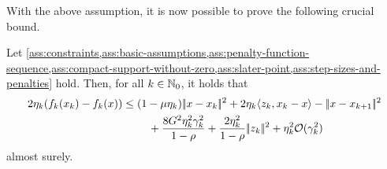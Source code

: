 With the above assumption, it is now possible to prove the following crucial bound.
\begin{lemma}
    \label{lem:functional-upper-bound}
    Let \cref{ass:constraints,ass:basic-assumptions,ass:penalty-function-sequence,ass:compact-support-without-zero,ass:slater-point,ass:step-sizes-and-penalties} hold.
    Then, for all $k\in\mathbb{N}_0$, it holds that
    \begin{align*}
        2\eta_k(f_k(x_k) - f_k(x))
        &\leq ( 1 - \mu\eta_k ) |\!|x - x_k|\!|^2 + 2\eta_k\langle z_k, x_k - x \rangle 
            - |\!|x - x_{k+1}|\!|^2 \notag \\
        &\phantom{===} + \frac{8 G^2\eta_k^2\gamma_k^2}{1 - \rho}
            + \frac{2\eta_k^2}{1 - \rho}|\!|z_k|\!|^2
            + \eta_k^2 \mathcal{O}(\gamma_k^2)
    \end{align*}
    almost surely.
\end{lemma}
